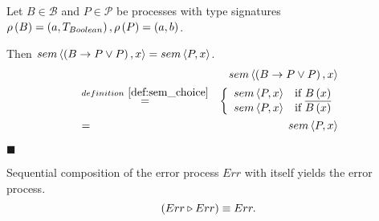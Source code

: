 \begin{myproof}
Let $B \in \mathcal{B}$ and $P \in \mathcal{P}$ be processes with type signatures $\rho \left( B \right) = \left( a, T_{Boolean} \right), \rho \left( P \right) = \left( a, b \right)$. 

Then $sem \left\langle \left( B \to P \vee P \right), x \right\rangle = sem \left\langle P, x \right\rangle$.
\begin{eqnarray*}
  & & \sem{\choice{B}{P}{P}}{x} \\
    & \overset{\defref{def:sem_choice}}{=} & \left\{\begin{array}{ll}
                                                      \sem{P}{x} & \text{if } B \left( x \right) \\
                                                      \sem{P}{x} & \text{if } \overline{B \left( x \right)}
                                                    \end{array}
                                             \right. \\
    & = & \sem{P}{x}
\end{eqnarray*}

\hfill$\blacksquare$
\end{myproof}


%


\begin{theorem}
\label{thm:idempotence_identity}
Sequential composition of the error process $Err$ with itself yields the error process.
\begin{equation*}
  \left( Err \triangleright Err \right) \equiv Err.
\end{equation*}
\end{theorem}

